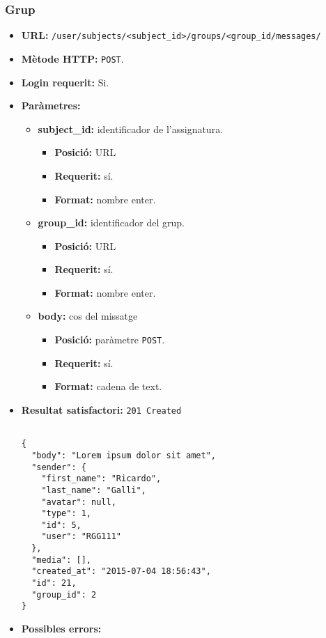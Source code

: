 	\subsubsection{Grup}
	\begin{itemize}
	\item \textbf{\ac{URL}:} \texttt{/user/subjects/<subject\_id>/groups/<group\_id/messages/}
	\item \textbf{Mètode \ac{HTTP}: } \texttt{POST}.
	\item \textbf{Login requerit:} Si.
	\item \textbf{Paràmetres:}
	\begin{itemize}
		\item \textbf{subject\_id:} identificador de l'assignatura.
		\begin{itemize}
			\item \textbf{Posició:} \ac{URL}
			\item \textbf{Requerit:} sí.
			\item \textbf{Format:} nombre enter.
		\end{itemize}
		\item \textbf{group\_id:} identificador del grup.
		\begin{itemize}
			\item \textbf{Posició:} \ac{URL}
			\item \textbf{Requerit:} sí.
			\item \textbf{Format:} nombre enter.
		\end{itemize}
		\item \textbf{body:} cos del missatge
		\begin{itemize}
			\item \textbf{Posició:} paràmetre \texttt{POST}.
			\item \textbf{Requerit:} sí.
			\item \textbf{Format:} cadena de text.
		\end{itemize}
	\end{itemize}
	\item \textbf{Resultat satisfactori:} \texttt{201 Created}
	\begin{verbatim}
	
{
  "body": "Lorem ipsum dolor sit amet",
  "sender": {
    "first_name": "Ricardo",
    "last_name": "Galli",
    "avatar": null,
    "type": 1,
    "id": 5,
    "user": "RGG111"
  },
  "media": [],
  "created_at": "2015-07-04 18:56:43",
  "id": 21,
  "group_id": 2
}
	\end{verbatim}
	\item \textbf{Possibles errors:}
	\begin{itemize}


\end{itemize}
\end{itemize}
